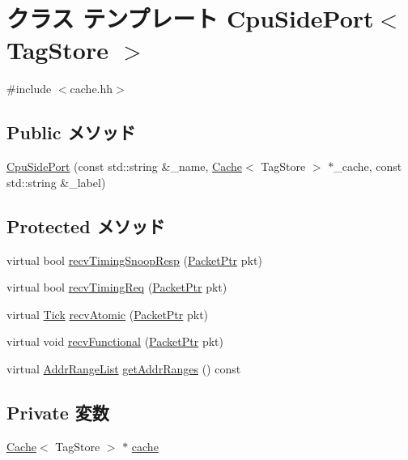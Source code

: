 \hypertarget{classCache_1_1CpuSidePort}{
\section{クラス テンプレート CpuSidePort$<$ TagStore $>$}
\label{classCache_1_1CpuSidePort}
}


{\ttfamily \#include $<$cache.hh$>$}\subsection*{Public メソッド}
\begin{DoxyCompactItemize}
\item 
\hyperlink{classCache_1_1CpuSidePort_a3caee65fa12179ad530ea38fe45bd8be}{CpuSidePort} (const std::string \&\_\-name, \hyperlink{classCache}{Cache}$<$ TagStore $>$ $\ast$\_\-cache, const std::string \&\_\-label)
\end{DoxyCompactItemize}
\subsection*{Protected メソッド}
\begin{DoxyCompactItemize}
\item 
virtual bool \hyperlink{classCache_1_1CpuSidePort_a9b643d565edc21dac11ce15a560238a7}{recvTimingSnoopResp} (\hyperlink{classPacket}{PacketPtr} pkt)
\item 
virtual bool \hyperlink{classCache_1_1CpuSidePort_a3344d9dd0f83257feab5424e761f31c6}{recvTimingReq} (\hyperlink{classPacket}{PacketPtr} pkt)
\item 
virtual \hyperlink{base_2types_8hh_a5c8ed81b7d238c9083e1037ba6d61643}{Tick} \hyperlink{classCache_1_1CpuSidePort_a5f0b4c4a94f6b0053f9d7a4eb9c2518a}{recvAtomic} (\hyperlink{classPacket}{PacketPtr} pkt)
\item 
virtual void \hyperlink{classCache_1_1CpuSidePort_aeefa907fb6d6a787e6dab90e8138ea90}{recvFunctional} (\hyperlink{classPacket}{PacketPtr} pkt)
\item 
virtual \hyperlink{classstd_1_1list}{AddrRangeList} \hyperlink{classCache_1_1CpuSidePort_a36cf113d5e5e091ebddb32306c098fae}{getAddrRanges} () const 
\end{DoxyCompactItemize}
\subsection*{Private 変数}
\begin{DoxyCompactItemize}
\item 
\hyperlink{classCache}{Cache}$<$ TagStore $>$ $\ast$ \hyperlink{classCache_1_1CpuSidePort_ae1a869e306f5bc5028f706229d68aba1}{cache}
\end{DoxyCompactItemize}


